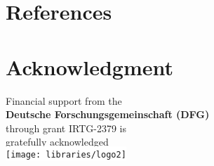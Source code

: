 \documentclass[t, aspectratio=169]{beamer}
\begin{document}
\section{References}
\begin{frame}

 \printbibliography
    
\end{frame}
\section{Acknowledgment} {
  \begin{frame}
    \begin{center}
      \vfill
      \Huge
      Financial support from the\\\textbf{Deutsche Forschungsgemeinschaft (DFG)}\\through grant IRTG-2379 is\\gratefully acknowledged\\[2ex]
      \colorbox{white}{\texttt{[image: libraries/logo2]}}
      \vfill
    \end{center}
  \end{frame}
}
\end{document}

